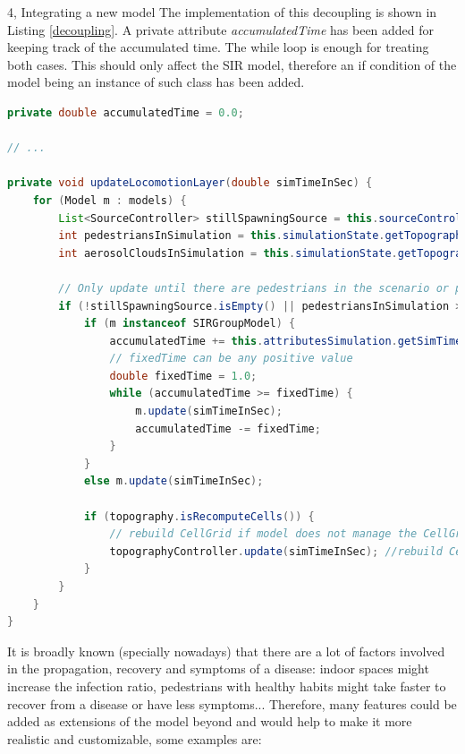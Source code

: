 \documentclass[10pt,a4paper]{article}
\begin{document}
\begin{task}{4, Integrating a new model}
The implementation of this decoupling is shown in Listing \ref{decoupling}. A private attribute \textit{accumulatedTime} has been added for keeping track of the accumulated time. The while loop is enough for treating both cases. This should only affect the SIR model, therefore an if condition of the model being an instance of such class has been added.

\newpage

\begin{lstlisting}[language = Java, caption = Decoupled version of the \textit{updateLocomotionLayer()} method, label={decoupling}]
private double accumulatedTime = 0.0;

// ...

private void updateLocomotionLayer(double simTimeInSec) {
	for (Model m : models) {
		List<SourceController> stillSpawningSource = this.sourceControllers.stream().filter(s -> !s.isSourceFinished(simTimeInSec)).collect(Collectors.toList());
		int pedestriansInSimulation = this.simulationState.getTopography().getPedestrianDynamicElements().getElements().size();
		int aerosolCloudsInSimulation = this.simulationState.getTopography().getAerosolClouds().size();

		// Only update until there are pedestrians in the scenario or pedestrian to spawn or aerosol clouds persist
		if (!stillSpawningSource.isEmpty() || pedestriansInSimulation > 0 || aerosolCloudsInSimulation > 0) {
			if (m instanceof SIRGroupModel) {
				accumulatedTime += this.attributesSimulation.getSimTimeStepLength();
				// fixedTime can be any positive value
				double fixedTime = 1.0;
				while (accumulatedTime >= fixedTime) {
					m.update(simTimeInSec);
					accumulatedTime -= fixedTime;
				}
			}
			else m.update(simTimeInSec);

			if (topography.isRecomputeCells()) {
				// rebuild CellGrid if model does not manage the CellGrid state while updating
				topographyController.update(simTimeInSec); //rebuild CellGrid
			}
		}
	}
}
\end{lstlisting}


It is broadly known (specially nowadays) that there are a lot of factors involved in the propagation, recovery and symptoms of a disease: indoor spaces might increase the infection ratio, pedestrians with healthy habits might take faster to recover from a disease or have less symptoms... Therefore, many features could be added as extensions of the model beyond and would help to make it more realistic and customizable, some examples are:


\end{task}
\end{document}

